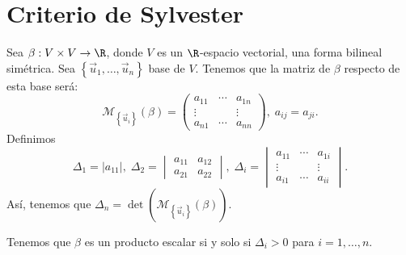 \section*{Criterio de Sylvester}
Sea $\displaystyle \beta : V \times V \to \R $, donde $\displaystyle V $ es un $\displaystyle \R $-espacio vectorial, una forma bilineal simétrica. Sea $\displaystyle \left\{ \vec{u}_{1}, \ldots, \vec{u}_{n}\right\}  $ base de $\displaystyle V $. Tenemos que la matriz de $\displaystyle \beta  $ respecto de esta base será:
\[\mathcal{M}_{ \left\{ \vec{u}_{i}\right\} }\left(\beta \right)= \begin{pmatrix} a_{11} & \cdots & a_{1n} \\
\vdots & & \vdots \\
a_{n1} & \cdots & a_{nn}\end{pmatrix}, \; a_{ij} = a_{ji} .\]
Definimos 
	\[ \Delta_{1} = \left|a_{11}\right|, \; \Delta_{2} = \begin{vmatrix} a_{11} & a_{12} \\ a_{21} & a_{22} \end{vmatrix} , \; \Delta_{i} = \begin{vmatrix} a_{11} & \cdots & a_{1i}\\
\vdots & & \vdots \\
 a_{i1} & \cdots & a_{ii}\end{vmatrix}  .\]
Así, tenemos que $\displaystyle \Delta_{n} = \det\left(\mathcal{M}_{ \left\{ \vec{u}_{i}\right\} }\left(\beta\right)\right) $. 
\begin{ftheorem}
\normalfont Tenemos que $\displaystyle \beta  $ es un producto escalar si y solo si $\displaystyle \Delta_{i} > 0 $ para $\displaystyle i = 1, \ldots, n $. 
\end{ftheorem}
